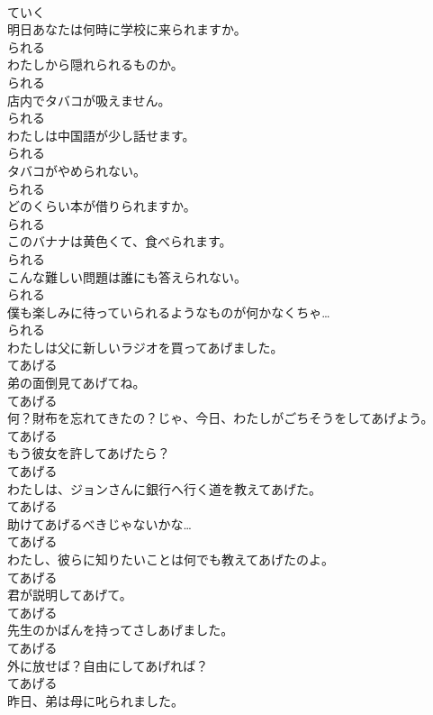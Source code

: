 \documentclass[8pt]{extreport}
\begin{document}
\begin{CJK}{UTF8}{min}
\\	ていく	
\\	明日あなたは何時に学校に来られますか。	
\\	られる	
\\	わたしから隠れられるものか。	
\\	られる	
\\	店内でタバコが吸えません。	
\\	られる	
\\	わたしは中国語が少し話せます。	
\\	られる	
\\	タバコがやめられない。	
\\	られる	
\\	どのくらい本が借りられますか。	
\\	られる	
\\	このバナナは黄色くて、食べられます。	
\\	られる	
\\	こんな難しい問題は誰にも答えられない。	
\\	られる	
\\	僕も楽しみに待っていられるようなものが何かなくちゃ…	
\\	られる	
\\	わたしは父に新しいラジオを買ってあげました。	
\\	てあげる	
\\	弟の面倒見てあげてね。	
\\	てあげる	
\\	何？財布を忘れてきたの？じゃ、今日、わたしがごちそうをしてあげよう。	
\\	てあげる	
\\	もう彼女を許してあげたら？	
\\	てあげる	
\\	わたしは、ジョンさんに銀行へ行く道を教えてあげた。	
\\	てあげる	
\\	助けてあげるべきじゃないかな…	
\\	てあげる	
\\	わたし、彼らに知りたいことは何でも教えてあげたのよ。	
\\	てあげる	
\\	君が説明してあげて。	
\\	てあげる	
\\	先生のかばんを持ってさしあげました。	
\\	てあげる	
\\	外に放せば？自由にしてあげれば？	
\\	てあげる	
\\	昨日、弟は母に叱られました。	

\end{CJK}
\end{document}
